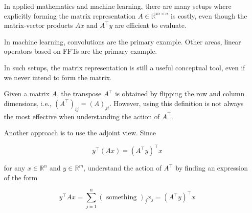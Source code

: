 \begin{concept}
    In applied mathematics and machine learning, there are many setups where explicitly forming the matrix representation $A \in \mathbb{R}^{m \times n}$ is costly, even though the matrix-vector products $A x$ and $A^{\top} y$ are efficient to evaluate.

    In machine learning, convolutions are the primary example. Other areas, linear operators based on FFTs are the primary example.

    In such setups, the matrix representation is still a useful conceptual tool, even if we never intend to form the matrix.
\end{concept}

Given a matrix $A$, the transpose $A^{\top}$ is obtained by flipping the row and column dimensions, i.e., $\left(A^{\top}\right)_{i j}=(A)_{j i}$.
However, using this definition is not always the most effective when understanding the action of $A^{\top}$.

Another approach is to use the adjoint view. Since

$$
y^{\top}(A x)=\left(A^{\top} y\right)^{\top} x
$$

for any $x \in \mathbb{R}^{n}$ and $y \in \mathbb{R}^{m}$, understand the action of $A^{\top}$ by finding an expression of the form

$$
y^{\top} A x=\sum_{j=1}^{n}(\text { something })_{j} x_{j}=\left(A^{\top} y\right)^{\top} x
$$

